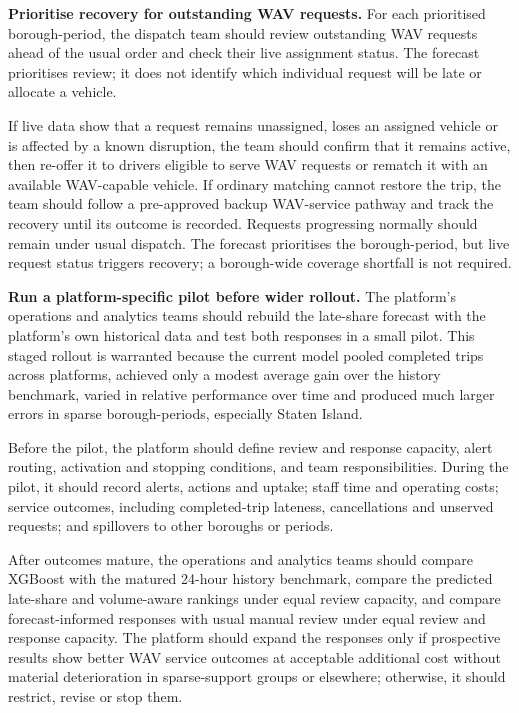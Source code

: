 \documentclass[11pt]{article}
\begin{document}
\textbf{Prioritise recovery for outstanding WAV requests.}
For each prioritised borough-period, the dispatch team should review outstanding WAV requests
ahead of the usual order and check their live assignment status. The forecast prioritises
review; it does not identify which individual request will be late or allocate a vehicle.

If live data show that a request remains unassigned, loses an assigned vehicle or is affected
by a known disruption, the team should confirm that it remains active, then re-offer it to
drivers eligible to serve WAV requests or rematch it with an available WAV-capable vehicle.
If ordinary matching cannot restore the trip, the team should follow a pre-approved backup
WAV-service pathway and track the recovery until its outcome is recorded. Requests progressing
normally should remain under usual dispatch. The forecast prioritises the borough-period, but
live request status triggers recovery; a borough-wide coverage shortfall is not required.

\textbf{Run a platform-specific pilot before wider rollout.}
The platform's operations and analytics teams should rebuild the late-share forecast with the
platform's own historical data and test both responses in a small pilot. This staged rollout is
warranted because the current model pooled completed trips across platforms, achieved only a
modest average gain over the history benchmark, varied in relative performance over time and
produced much larger errors in sparse borough-periods, especially Staten Island.

Before the pilot, the platform should define review and response capacity, alert routing,
activation and stopping conditions, and team responsibilities. During the pilot, it should
record alerts, actions and uptake; staff time and operating costs; service outcomes, including
completed-trip lateness, cancellations and unserved requests; and spillovers to other boroughs
or periods.

After outcomes mature, the operations and analytics teams should compare XGBoost with the
matured 24-hour history benchmark, compare the predicted late-share and volume-aware rankings
under equal review capacity, and compare forecast-informed responses with usual manual review
under equal review and response capacity. The platform should expand the responses only if
prospective results show better WAV service outcomes at acceptable additional cost without
material deterioration in sparse-support groups or elsewhere; otherwise, it should restrict,
revise or stop them.
\end{document}
